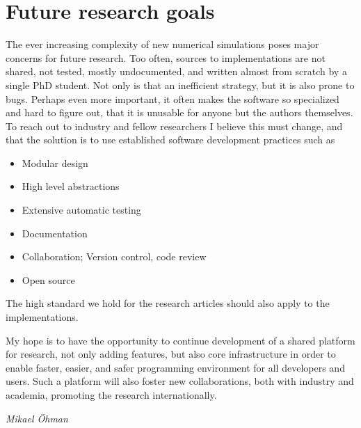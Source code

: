 \documentclass{article}
\begin{document}
\section{Future research goals}
The ever increasing complexity of new numerical simulations poses major concerns for future research.
Too often, sources to implementations are not shared, not tested, mostly undocumented, and written almost from scratch by a single PhD student.
Not only is that an inefficient strategy, but it is also prone to bugs.
Perhaps even more important, it often makes the software so specialized and hard to figure out, that it is unusable for anyone but the authors themselves.
To reach out to industry and fellow researchers I believe this must change, and that the solution is to use established software development practices such as
\begin{itemize}
 \item Modular design
 \item High level abstractions
 \item Extensive automatic testing
 \item Documentation
 \item Collaboration; Version control, code review
 \item Open source
\end{itemize}
The high standard we hold for the research articles should also apply to the implementations.

My hope is to have the opportunity to continue development of a shared platform for research, not only adding features, but also core infrastructure in order to enable faster, easier, and safer programming environment for all developers and users.
Such a platform will also foster new collaborations, both with industry and academia, promoting the research internationally.

\vspace{1cm}\hspace{2cm}\textit{Mikael Öhman}
\end{document}
